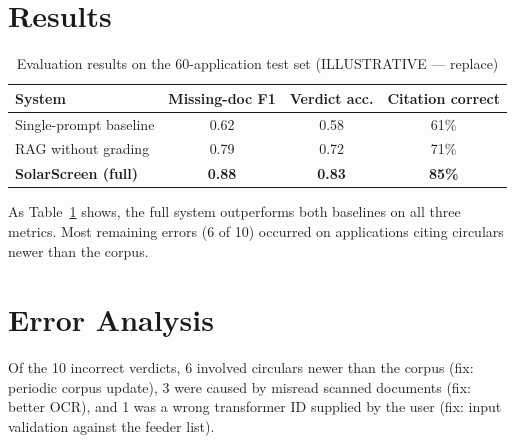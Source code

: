 \documentclass[12pt,a4paper,oneside]{report}
\newif\ifguidance
\newcommand{\guide}[1]{%
  \ifguidance
  \begin{tcolorbox}[enhanced,breakable,colback=guidebg,colframe=bmsblue,
    boxrule=0.6pt,arc=2pt,left=6pt,right=6pt,top=4pt,bottom=4pt,
    fonttitle=\bfseries\small,title={What to write here},
    before upper={\small\setstretch{1.1}}]
  #1
  \end{tcolorbox}
  \fi}
\newcommand{\dodont}[2]{%
  \ifguidance
  \begin{tcolorbox}[enhanced,breakable,sidebyside,sidebyside align=top seam,
    colback=dobg,colbacklower=dontbg,colframe=gray!60,boxrule=0.5pt,arc=2pt,
    lefthand ratio=0.5,left=5pt,right=5pt,top=4pt,bottom=4pt,
    fontupper=\small\setstretch{1.05},fontlower=\small\setstretch{1.05}]
  \textbf{\textcolor{ForestGreen}{\checkmark\ Do}}
  \begin{itemize}[leftmargin=12pt,itemsep=1pt,topsep=2pt]#1\end{itemize}
  \tcblower
  \textbf{\textcolor{BrickRed}{$\times$ Don't}}
  \begin{itemize}[leftmargin=12pt,itemsep=1pt,topsep=2pt]#2\end{itemize}
  \end{tcolorbox}
  \fi}
\newenvironment{sample}
  {\par\noindent{\footnotesize\bfseries\textcolor{BrickRed}{[SAMPLE --- replace with your own content]}}\par\color{samplecol}}
  {\par\medskip}
\begin{document}
\section{Results}
\guide{Present results in tables and figures, then interpret them in text. Discuss failures as well
as successes.}
\dodont{\item Report means with spread (standard deviation or range) where runs vary.
\item Explain why the system fails on its failure cases.}
{\item \textbf{Never copy the illustrative numbers in this template.}
\item Do not report only the best run.}
\begin{sample}
\begin{table}[H]
\centering
\caption{Evaluation results on the 60-application test set \textcolor{BrickRed}{(ILLUSTRATIVE --- replace)}}
\label{tab:results}
\small
\begin{tabular}{@{}lccc@{}}
\toprule
\textbf{System} & \textbf{Missing-doc F1} & \textbf{Verdict acc.} & \textbf{Citation correct} \\ \midrule
Single-prompt baseline & 0.62 & 0.58 & 61\% \\
RAG without grading & 0.79 & 0.72 & 71\% \\
\textbf{SolarScreen (full)} & \textbf{0.88} & \textbf{0.83} & \textbf{85\%} \\
\bottomrule
\end{tabular}
\end{table}
As Table~\ref{tab:results} shows, the full system outperforms both baselines on all three metrics.
Most remaining errors (6 of 10) occurred on applications citing circulars newer than the corpus.
\end{sample}

\section{Error Analysis}
\guide{Group the failures into categories, give counts and one example per category, and state what
would fix each category.}
\dodont{\item Show at least one real failure example.
}
{\item Do not omit failures to make results look better.
}

\begin{sample}
Of the 10 incorrect verdicts, 6 involved circulars newer than the corpus (fix: periodic corpus
update), 3 were caused by misread scanned documents (fix: better OCR), and 1 was a wrong
transformer ID supplied by the user (fix: input validation against the feeder list).
\end{sample}
\end{document}
